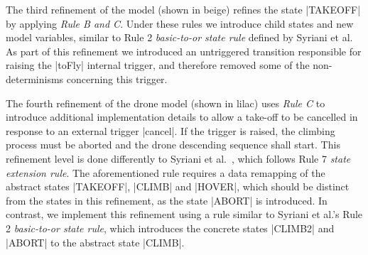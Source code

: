 The third refinement of the model (shown in beige) refines the state |TAKEOFF| by applying \emph{Rule B and C}. 
Under these rules we introduce child states and new model variables, similar to Rule 2 \emph{basic-to-or state rule} defined by Syriani et al.~\cite{Syriani_2019}
As part of this refinement we introduced an untriggered transition responsible for raising the |toFly| internal trigger, and therefore removed some of the non-determinisms concerning this trigger.

The fourth refinement of the drone model (shown in lilac) uses \emph{Rule C} to introduce additional implementation details to 
allow a take-off to be cancelled in response to an external trigger |cancel|.
If the trigger is raised, the climbing process must be aborted and the drone descending sequence shall start. 
This refinement level is done differently to Syriani et al.~\cite{Syriani_2019}, which follows Rule 7 \emph{state extension rule}. 
The aforementioned rule requires a data remapping of the abstract states |TAKEOFF|, |CLIMB| and |HOVER|, which should be distinct from the states in this  refinement, as the state |ABORT| is introduced.
In contrast, we implement this refinement using a rule similar to Syriani et al.'s  Rule 2 \emph{basic-to-or state rule}, which introduces the concrete states |CLIMB2| and |ABORT| to the abstract state |CLIMB|.




